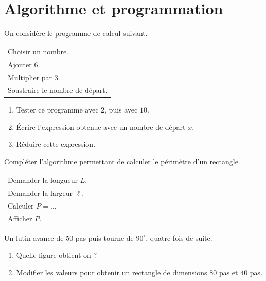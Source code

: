 \documentclass[a4paper,10pt]{report}
\begin{document}
\pagestyle{empty}
\section*{Algorithme et programmation}

\begin{ex}
On considère le programme de calcul suivant.
\begin{center}
\begin{tabular}{|l|}
\hline
Choisir un nombre.\\
Ajouter $6$.\\
Multiplier par $3$.\\
Soustraire le nombre de départ.\\
\hline
\end{tabular}
\end{center}
\begin{enumerate}
\item Tester ce programme avec $2$, puis avec $10$.
\item Écrire l'expression obtenue avec un nombre de départ $x$.
\item Réduire cette expression.
\end{enumerate}
\end{ex}

\begin{ex}
Compléter l'algorithme permettant de calculer le périmètre d'un rectangle.
\begin{center}
\begin{tabular}{|l|}
\hline
Demander la longueur $L$.\\
Demander la largeur $\ell$.\\
Calculer $P=\ldots$\\
Afficher $P$.\\
\hline
\end{tabular}
\end{center}
\end{ex}

\begin{ex}
Un lutin avance de $50$ pas puis tourne de $90^\circ$, quatre fois de suite.
\begin{enumerate}
\item Quelle figure obtient-on ?
\item Modifier les valeurs pour obtenir un rectangle de dimensions $80$ pas et $40$ pas.
\end{enumerate}
\end{ex}
\end{document}
